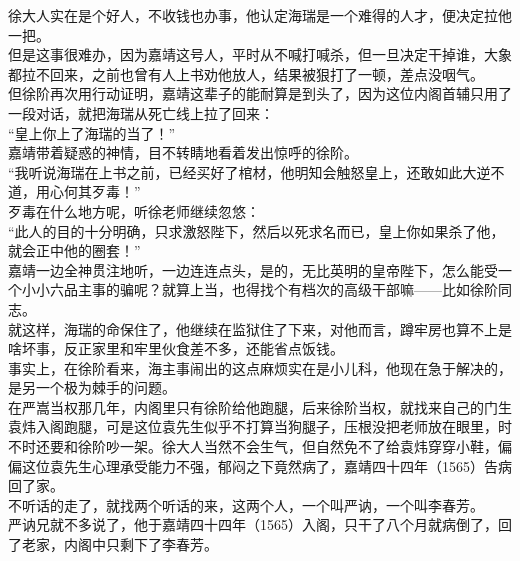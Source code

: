 \begin{multicols}{\theparacolNo}
徐大人实在是个好人，不收钱也办事，他认定海瑞是一个难得的人才，便决定拉他一把。\\

但是这事很难办，因为嘉靖这号人，平时从不喊打喊杀，但一旦决定干掉谁，大象都拉不回来，之前也曾有人上书劝他放人，结果被狠打了一顿，差点没咽气。\\

但徐阶再次用行动证明，嘉靖这辈子的能耐算是到头了，因为这位内阁首辅只用了一段对话，就把海瑞从死亡线上拉了回来：\\

“皇上你上了海瑞的当了！”\\

嘉靖带着疑惑的神情，目不转睛地看着发出惊呼的徐阶。\\

“我听说海瑞在上书之前，已经买好了棺材，他明知会触怒皇上，还敢如此大逆不道，用心何其歹毒！”\\

歹毒在什么地方呢，听徐老师继续忽悠：\\

“此人的目的十分明确，只求激怒陛下，然后以死求名而已，皇上你如果杀了他，就会正中他的圈套！”\\

嘉靖一边全神贯注地听，一边连连点头，是的，无比英明的皇帝陛下，怎么能受一个小小六品主事的骗呢？就算上当，也得找个有档次的高级干部嘛——比如徐阶同志。\\

就这样，海瑞的命保住了，他继续在监狱住了下来，对他而言，蹲牢房也算不上是啥坏事，反正家里和牢里伙食差不多，还能省点饭钱。\\

事实上，在徐阶看来，海主事闹出的这点麻烦实在是小儿科，他现在急于解决的，是另一个极为棘手的问题。\\

在严嵩当权那几年，内阁里只有徐阶给他跑腿，后来徐阶当权，就找来自己的门生袁炜入阁跑腿，可是这位袁先生似乎不打算当狗腿子，压根没把老师放在眼里，时不时还要和徐阶吵一架。徐大人当然不会生气，但自然免不了给袁炜穿穿小鞋，偏偏这位袁先生心理承受能力不强，郁闷之下竟然病了，嘉靖四十四年（1565）告病回了家。\\

不听话的走了，就找两个听话的来，这两个人，一个叫严讷，一个叫李春芳。\\

严讷兄就不多说了，他于嘉靖四十四年（1565）入阁，只干了八个月就病倒了，回了老家，内阁中只剩下了李春芳。\\


\end{multicols}
